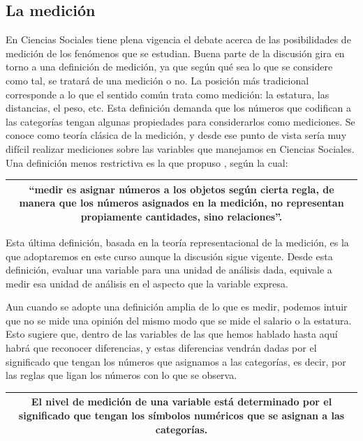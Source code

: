 \documentclass[]{book}
\begin{document}
\hypertarget{la-medicion}{%
\subsection{La medición}\label{la-medicion}}

En Ciencias Sociales tiene plena vigencia el debate acerca de las posibilidades de medición de los fenómenos que se estudian. Buena parte de la discusión gira en torno a una definición de medición, ya que según qué sea lo que se considere como tal, se tratará de una medición o no. La posición más tradicional corresponde a lo que el sentido común trata como medición: la estatura, las distancias, el peso, etc. Esta definición demanda que los números que codifican a las categorías tengan algunas propiedades para considerarlos como mediciones. Se conoce como teoría clásica de la medición, y desde ese punto de vista sería muy difícil realizar mediciones sobre las variables que manejamos en Ciencias Sociales. Una definición menos restrictiva es la que propuso \citet{Stevens1946}, según la cual:

\begin{longtable}[]{@{}c@{}}
\toprule
\endhead
\begin{minipage}[t]{0.97\columnwidth}\centering
``medir es asignar números a los objetos según cierta regla, de manera que los números asignados en la medición, no representan propiamente cantidades, sino relaciones''.\strut
\end{minipage}\tabularnewline
\bottomrule
\end{longtable}

Esta última definición, basada en la teoría representacional de la medición, es la que adoptaremos en este curso aunque la discusión sigue vigente. Desde esta definición, evaluar una variable para una unidad de análisis dada, equivale a medir esa unidad de análisis en el aspecto que la variable expresa.

Aun cuando se adopte una definición amplia de lo que es medir, podemos intuir que no se mide una opinión del mismo modo que se mide el salario o la estatura. Esto sugiere que, dentro de las variables de las que hemos hablado hasta aquí habrá que reconocer diferencias, y estas diferencias vendrán dadas por el significado que tengan los números que asignamos a las categorías, es decir, por las reglas que ligan los números con lo que se observa.

\begin{longtable}[]{@{}c@{}}
\toprule
\endhead
\begin{minipage}[t]{0.97\columnwidth}\centering
El \textbf{nivel de medición} de una variable está determinado por el significado que tengan los símbolos numéricos que se asignan a las categorías.\strut
\end{minipage}\tabularnewline
\bottomrule
\end{longtable}
\end{document}
